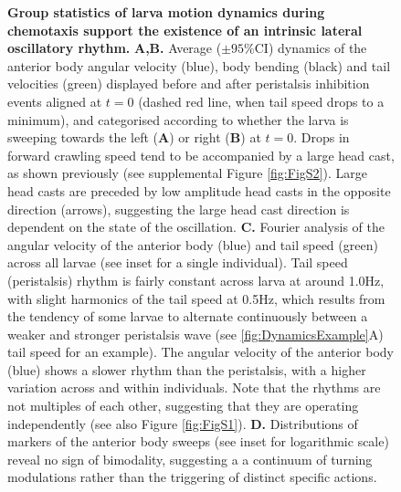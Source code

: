 \documentclass[11pt,a4paper]{article}
\begin{document}
\begin{figure}[ht!]
\begin{center}
\caption{{\bf Group statistics of larva motion dynamics during chemotaxis support the existence of an intrinsic lateral oscillatory rhythm.}
{\bf A,B.} Average ($\pm 95\%$CI) dynamics of the anterior body angular velocity (blue), body bending (black) and tail velocities (green) displayed before and after peristalsis inhibition events aligned at $t=0$ (dashed red line, when tail speed drops to a minimum), and categorised according to whether the larva is sweeping towards the left ({\bf A}) or right ({\bf B}) at $t=0$. Drops in forward crawling speed tend to be accompanied by a large head cast, as shown previously \citep{hernandez2015reverse} (see supplemental Figure \ref{fig:FigS2}). Large head casts are preceded by low amplitude head casts in the opposite direction (arrows), suggesting the large head cast direction is dependent on the state of the oscillation. %
{\bf C.} Fourier analysis of the angular velocity of the anterior body (blue) and tail speed (green) across all larvae (see inset for a single individual). Tail speed (peristalsis) rhythm is fairly constant across larva at around 1.0Hz, with slight harmonics of the tail speed at 0.5Hz, which results from the tendency of some larvae to alternate continuously between a weaker and stronger peristalsis wave (see \ref{fig:DynamicsExample}A) tail speed for an example). The angular velocity of the anterior body (blue) shows a slower rhythm than the peristalsis, with a higher variation across and within individuals. Note that the rhythms are not multiples of each other, suggesting that they are operating independently (see also Figure \ref{fig:FigS1}).
 {\bf D.} Distributions of markers of the anterior body sweeps (see inset for logarithmic scale) reveal no sign of bimodality, suggesting a a continuum of turning modulations rather than the triggering of distinct specific actions.
\label{fig:GroupAnalysis}
}
\end{center}
\end{figure}
%
\end{document}
